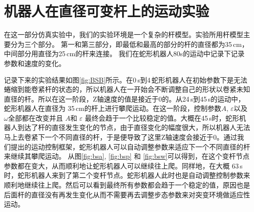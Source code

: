 \section{机器人在直径可变杆上的运动实验}
在这一部分仿真实验中，我们的实验环境是一个复杂的杆模型。实验所用杆模型主要分为三个部分。 第一和第三部分，即最低和最高的部分的杆的直径都为35\,cm，中间部分用直径为25\,cm的杆来连接。 我们在蛇形机器人80s的运动中记录下记录参数和速度的变化。

记录下来的实验结果如图\ref{fig:BSB}所示。在0\,s到4\,蛇形机器人在初始参数下是无法蜷缩到能卷紧杆的状态的，所以机器人在一开始会不断调整自己的形状以卷紧未知直径的杆。所以在这一阶段，Z轴速度的值是接近于0的。从24\,s到45\,s的运动中，蛇形机器人在直径为 35\,cm的杆上进行攀爬运动。在这一阶段，控制参数$A$, $\varepsilon$以及$\omega$全部都在改变并且 $A$和 $\varepsilon$ 最终会趋于一个比较稳定的值。大概在45\,s时，蛇形机器人到达了杆的直径发生变化的节点，由于直径变化的幅度很大，所以机器人无法马上去卷紧下一个不同直径的杆，于是便导致了这里Z轴速度会接近于0。通过我们提出的运动控制框架，蛇形机器人可以自动调整参数来适应下一个不同直径的杆来继续其攀爬运动。 从图\ref{fig:bsa}, \ref{fig:bsp} 和 \ref{fig:bsw}可以得到，在这个变杆节点参数都在变大，从而顺利地让蛇形机器人可以继续往上爬。同样地，在大概 63\,s时，蛇形机器人来到了第二个变杆节点。蛇形机器人此时也是自动调整控制参数来顺利地继续往上爬。然后可以看到最终所有参数都会趋于一个稳定的值，原因也是后面杆的直径没有再发生变化从而不需要再去调整步态参数来对突变环境做适应性运动。
